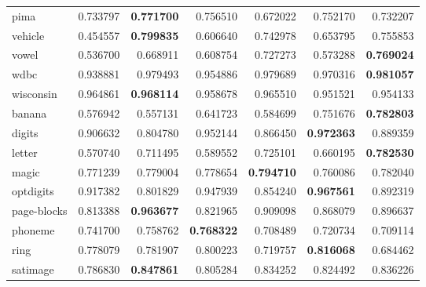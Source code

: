 \begin{tabular}{lrrrrrr}
pima            &         0.733797 &  \textbf{0.771700} &                  0.756510 &       0.672022 &                  0.752170 &       0.732207 \\
vehicle         &         0.454557 &  \textbf{0.799835} &                  0.606640 &       0.742978 &                  0.653795 &       0.755853 \\
vowel           &         0.536700 &  0.668911 &                  0.608754 &       0.727273 &                  0.573288 &       \textbf{0.769024} \\
wdbc            &         0.938881 &  0.979493 &                  0.954886 &       0.979689 &                  0.970316 &       \textbf{0.981057} \\
wisconsin       &         0.964861 &  \textbf{0.968114} &                  0.958678 &       0.965510 &                  0.951521 &       0.954133 \\
banana          &         0.576942 &  0.557131 &                  0.641723 &       0.584699 &                  0.751676 &       \textbf{0.782803} \\
digits          &         0.906632 &  0.804780 &                  0.952144 &       0.866450 &                  \textbf{0.972363} &       0.889359 \\
letter          &         0.570740 &  0.711495 &                  0.589552 &       0.725101 &                  0.660195 &       \textbf{0.782530} \\
magic           &         0.771239 &  0.779004 &                  0.778654 &       \textbf{0.794710} &                  0.760086 &       0.782040 \\
optdigits       &         0.917382 &  0.801829 &                  0.947939 &       0.854240 &                  \textbf{0.967561} &       0.892319 \\
page-blocks     &         0.813388 &  \textbf{0.963677} &                  0.821965 &       0.909098 &                  0.868079 &       0.896637 \\
phoneme         &         0.741700 &  0.758762 &                  \textbf{0.768322} &       0.708489 &                  0.720734 &       0.709114 \\
ring            &         0.778079 &  0.781907 &                  0.800223 &       0.719757 &                  \textbf{0.816068} &       0.684462 \\
satimage        &         0.786830 &  \textbf{0.847861} &                  0.805284 &       0.834252 &                  0.824492 &       0.836226 \\

\end{tabular}
